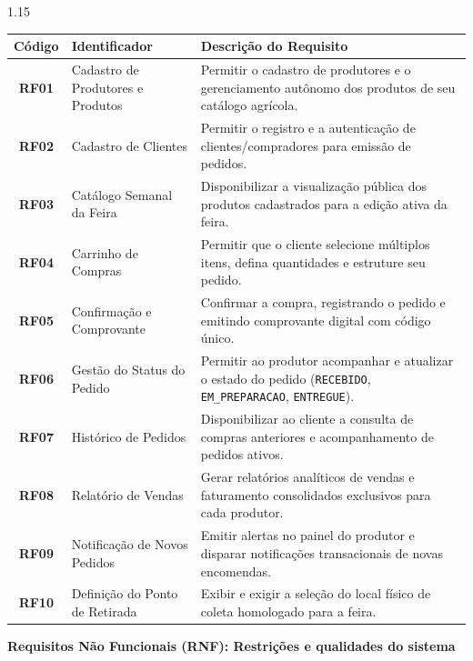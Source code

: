 \documentclass[12pt,a4paper]{article}
\begin{document}
\noindent
\begin{spacing}{1.15}
\begin{tabularx}{\textwidth}{|c|p{4.5cm}|X|}
\hline
\textbf{Código} & \textbf{Identificador} & \textbf{Descrição do Requisito} \\ \hline
\textbf{RF01} & Cadastro de Produtores e Produtos & Permitir o cadastro de produtores e o gerenciamento autônomo dos produtos de seu catálogo agrícola. \\ \hline
\textbf{RF02} & Cadastro de Clientes & Permitir o registro e a autenticação de clientes/compradores para emissão de pedidos. \\ \hline
\textbf{RF03} & Catálogo Semanal da Feira & Disponibilizar a visualização pública dos produtos cadastrados para a edição ativa da feira. \\ \hline
\textbf{RF04} & Carrinho de Compras & Permitir que o cliente selecione múltiplos itens, defina quantidades e estruture seu pedido. \\ \hline
\textbf{RF05} & Confirmação e Comprovante & Confirmar a compra, registrando o pedido e emitindo comprovante digital com código único. \\ \hline
\textbf{RF06} & Gestão do Status do Pedido & Permitir ao produtor acompanhar e atualizar o estado do pedido (\texttt{RECEBIDO}, \texttt{EM\_PREPARACAO}, \texttt{ENTREGUE}). \\ \hline
\textbf{RF07} & Histórico de Pedidos & Disponibilizar ao cliente a consulta de compras anteriores e acompanhamento de pedidos ativos. \\ \hline
\textbf{RF08} & Relatório de Vendas & Gerar relatórios analíticos de vendas e faturamento consolidados exclusivos para cada produtor. \\ \hline
\textbf{RF09} & Notificação de Novos Pedidos & Emitir alertas no painel do produtor e disparar notificações transacionais de novas encomendas. \\ \hline
\textbf{RF10} & Definição do Ponto de Retirada & Exibir e exigir a seleção do local físico de coleta homologado para a feira. \\ \hline
\end{tabularx}
\end{spacing}

\vspace{0.6cm}

\newpage

\noindent \textbf{Requisitos Não Funcionais (RNF): Restrições e qualidades do sistema}
\end{document}
